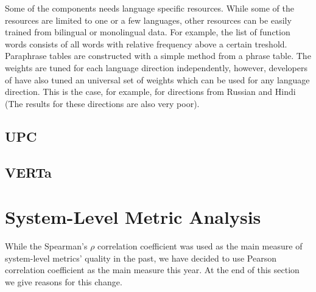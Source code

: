 Some of the  components needs language specific resources.
While some of the resources are limited to one or a few languages, other
resources can be easily trained from bilingual or monolingual data. For
example, the list of function words consists of all words with relative
frequency above a certain treshold. Paraphrase tables are constructed with a
simple method from a phrase table. The weights are tuned for each language
direction independently, however, developers of  have also tuned
an universal set of weights which can be used for any language direction. This
is the case, for example, for directions from Russian and Hindi (The results
for these directions are also very poor).

\subsection{UPC}
\subsection{VERTa}


\section{System-Level Metric Analysis}
\label{system-level}


While the Spearman's $\rho$ correlation coefficient was used as the main
measure of system-level metrics' quality in the past, we have decided to use
Pearson correlation coefficient as the main measure this year. At the end of
this section we give reasons for this change. 

